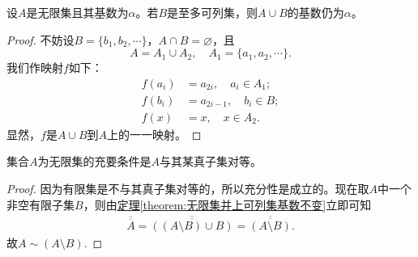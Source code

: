 \documentclass[lang=cn,newtx,10pt,scheme=chinese]{../Template/elegantbook}
\begin{document}
\begin{theorem}\label{theorem:无限集并上可列集基数不变}
设\(A\)是无限集且其基数为\(\alpha\)。若\(B\)是至多可列集，则\(A\cup B\)的基数仍为\(\alpha\)。
\end{theorem}
\begin{proof}
  不妨设\(B = \{b_1,b_2,\cdots\}\)，\(A\cap B=\varnothing\)，且
\[A = A_1\cup A_2, \quad A_1 = \{a_1,a_2,\cdots\}.\]
我们作映射\(f\)如下：
\begin{align*}
f(a_i)&=a_{2i}, \quad a_i\in A_1;\\
f(b_i)&=a_{2i - 1}, \quad b_i\in B;\\
f(x)&=x, \quad x\in A_2.
\end{align*}
显然，\(f\)是\(A\cup B\)到\(A\)上的一一映射。

\end{proof}

\begin{theorem}\label{theorem:无限集的充要条件}
集合\(A\)为无限集的充要条件是\(A\)与其某真子集对等。
\end{theorem}
\begin{proof}
因为有限集是不与其真子集对等的，所以充分性是成立的。现在取\(A\)中一个非空有限子集\(B\)，则由\hyperref[theorem:无限集并上可列集基数不变]{定理\ref{theorem:无限集并上可列集基数不变}}立即可知
\begin{align*}
  \overline{\overline{A}}=\overline{\overline{\left( \left( A\setminus B \right) \cup B \right) }}=\overline{\overline{\left( A\setminus B \right) }}.
\end{align*}
故$A\sim \left( A\setminus B \right) $.

\end{proof}
\end{document}
